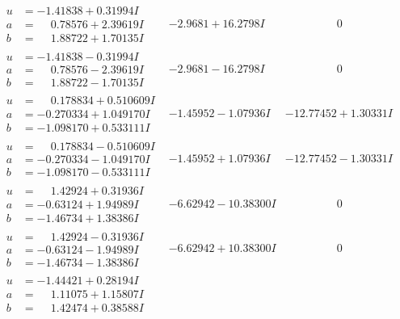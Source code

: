 \documentclass[1p]{elsarticle_modified}
\theoremstyle{definition}
\begin{document}
$$\begin{array}{c|c|c}
 \hline 
\begin{aligned}
u &= -1.41838 + 0.31994 I \\
a &= \phantom{-}0.78576 + 2.39619 I \\
b &= \phantom{-}1.88722 + 1.70135 I\end{aligned}
 & -2.9681 + 16.2798 I & \phantom{-0.000000 } 0 \\ \hline\begin{aligned}
u &= -1.41838 - 0.31994 I \\
a &= \phantom{-}0.78576 - 2.39619 I \\
b &= \phantom{-}1.88722 - 1.70135 I\end{aligned}
 & -2.9681 - 16.2798 I & \phantom{-0.000000 } 0 \\ \hline\begin{aligned}
u &= \phantom{-}0.178834 + 0.510609 I \\
a &= -0.270334 + 1.049170 I \\
b &= -1.098170 + 0.533111 I\end{aligned}
 & -1.45952 - 1.07936 I & -12.77452 + 1.30331 I \\ \hline\begin{aligned}
u &= \phantom{-}0.178834 - 0.510609 I \\
a &= -0.270334 - 1.049170 I \\
b &= -1.098170 - 0.533111 I\end{aligned}
 & -1.45952 + 1.07936 I & -12.77452 - 1.30331 I \\ \hline\begin{aligned}
u &= \phantom{-}1.42924 + 0.31936 I \\
a &= -0.63124 + 1.94989 I \\
b &= -1.46734 + 1.38386 I\end{aligned}
 & -6.62942 - 10.38300 I & \phantom{-0.000000 } 0 \\ \hline\begin{aligned}
u &= \phantom{-}1.42924 - 0.31936 I \\
a &= -0.63124 - 1.94989 I \\
b &= -1.46734 - 1.38386 I\end{aligned}
 & -6.62942 + 10.38300 I & \phantom{-0.000000 } 0 \\ \hline\begin{aligned}
u &= -1.44421 + 0.28194 I \\
a &= \phantom{-}1.11075 + 1.15807 I \\
b &= \phantom{-}1.42474 + 0.38588 I\end{aligned}

\end{array}$$
\end{document}
